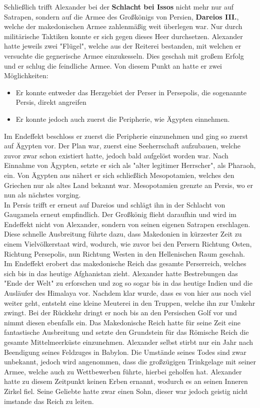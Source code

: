 \documentclass{article}
\begin{document}
	Schließlich trifft Alexander bei der \textbf{Schlacht bei Issos} nicht mehr nur auf Satrapen, sondern auf die Armee des Großkönigs von Persien, \textbf{Dareios III.}, welche der makedonischen Armee zahlenmäßig weit überlegen war. Nur durch militärische Taktiken konnte er sich gegen dieses Heer durchsetzen. Alexander hatte jeweils zwei "Flügel", welche aus der Reiterei bestanden, mit welchen er versuchte die gegnerische Armee einzukesseln. Dies geschah mit großem Erfolg und er schlug die feindliche Armee. Von diesem Punkt an hatte er zwei Möglichkeiten:
	\begin{itemize}
		\item{Er konnte entweder das Herzgebiet der Perser in Persepolis, die sogenannte Persis, direkt angreifen}
		\item{Er konnte jedoch auch zuerst die Peripherie, wie Ägypten einnehmen.}
	\end{itemize}
	Im Endeffekt beschloss er zuerst die Peripherie einzunehmen und ging so zuerst auf Ägypten vor. Der Plan war, zuerst eine Seeherrschaft aufzubauen, welche zuvor zwar schon existiert hatte, jedoch bald aufgelöst worden war. Nach Einnahme von Ägypten, setzte er sich als "alter legitimer Herrscher", als Pharaoh, ein. Von Ägypten aus nähert er sich schließlich Mesopotamien, welches den Griechen nur als altes Land bekannt war. Mesopotamien grenzte an Persis, wo er nun als nächstes vorging. \\
	In Persis trifft er erneut auf Dareios und schlägt ihn in der Schlacht von Gaugamela erneut empfindlich. Der Großkönig flieht daraufhin und wird im Endeffekt nicht von Alexander, sondern von seinen eigenen Satrapen erschlagen. \\
	Diese schnelle Ausbreitung führte dazu, dass Makedonien in kürzester Zeit zu einem Vielvölkerstaat wird, wodurch, wie zuvor bei den Persern Richtung Osten, Richtung Persepolis, nun Richtung Westen in den Hellenischen Raum geschah. \\
	Im Endeffekt erobert das makedonische Reich das gesamte Perserreich, welches sich bis in das heutige Afghanistan zieht. Alexander hatte Bestrebungen das "Ende der Welt" zu erforschen und zog so sogar bis in das heutige Indien und die Ausläufer des Himalaya vor. Nachdem klar wurde, dass es von hier aus noch viel weiter geht, entsteht eine kleine Meuterei in den Truppen, welche ihn zur Umkehr zwingt. Bei der Rückkehr dringt er noch bis an den Persischen Golf vor und nimmt diesen ebenfalls ein. Das Makedonische Reich hatte für seine Zeit eine fantastische Ausbreitung und setzte den Grundstein für das Römische Reich die gesamte Mittelmeerküste einzunehmen. Alexander selbst stirbt nur ein Jahr nach Beendigung seines Feldzuges in Babylon. Die Umstände seines Todes sind zwar unbekannt, jedoch wird angenommen, dass die großzügigen Trinkgelage mit seiner Armee, welche auch zu Wettbewerben führte, hierbei geholfen hat. Alexander hatte zu diesem Zeitpunkt keinen Erben ernannt, wodurch es an seinen Inneren Zirkel fiel. Seine Geliebte hatte zwar einen Sohn, dieser war jedoch geistig nicht imstande das Reich zu leiten. \\
\end{document}
